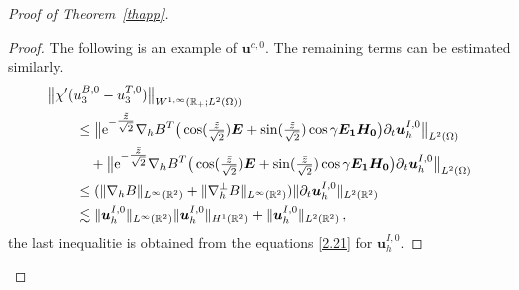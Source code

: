 \documentclass[pdflatex,sn-mathphys-num]{sn-jnl}%
\theoremstyle{thmstyleone}%
\theoremstyle{thmstyletwo}%
\theoremstyle{thmstylethree}%
\theoremstyle{thmstyletwo}
\begin{document}
\begin{proof}[Proof of Theorem~{\upshape\ref{thapp}}]
\begin{proof}
	The following is an example of $\boldsymbol{u}^{c,0}$. The remaining terms can be estimated similarly.
	\begin{align*}
		&\big\lVert\chi'({u}_3^{B,0}-{u}_3^{T,0})\big\rVert_{W^{1,\infty}(\mathbb{R}_+;L^2(\Omega))}\\
		&\qquad\leq\big\lVert
		\mathrm{e}^{-\tfrac{\tilde z}{\sqrt 2}}
		\nabla_hB^T\big(
		\cos(\tfrac{\tilde z}{\sqrt 2})\boldsymbol{E}+\sin(\tfrac{\tilde z}{\sqrt 2})\cos\gamma\boldsymbol{E_1}\boldsymbol{H_0}
		\big)\partial_t{\boldsymbol{u}}^{I,0}_h
		\big\rVert_{L^2(\Omega)}\notag\\
		&\qquad\quad+\big\lVert
		\mathrm{e}^{-\tfrac{\bar z}{\sqrt 2}}
		\nabla_hB^T\big(
		\cos(\tfrac{\bar z}{\sqrt 2})\boldsymbol{E}+\sin(\tfrac{\bar z}{\sqrt 2})\cos\gamma\boldsymbol{E_1}\boldsymbol{H_0}
		\big)\partial_t{\boldsymbol{u}}_h^{I,0}
		\big\rVert_{L^2(\Omega)}\notag\\
		&\qquad\leq
		(\lVert\nabla_{ h}B\rVert_{{L}^{\infty}(\mathbb{R}^2)}
		+\lVert\nabla^\bot_{ h}B\rVert_{{L}^{\infty}(\mathbb{R}^2)})
		\lVert
		\partial_t{\boldsymbol{u}}^{I,0}_h
		\rVert_{{L}^{2}(\mathbb{R}^2)}\notag\\
		&\qquad\lesssim
		\lVert
		\boldsymbol{u}^{I,0}_h
		\rVert_{{L}^{\infty}(\mathbb{R}^2)}
		\lVert
		\boldsymbol{u}^{I,0}_h
		\rVert_{{H}^{1}(\mathbb{R}^2)}+ 
		\lVert
		\boldsymbol{u}^{I,0}_h
		\rVert_{{L}^{2}(\mathbb{R}^2)}
		\,,\notag
	\end{align*}
	the last inequalitie is obtained from the equations \eqref{2.21} for $\boldsymbol{u}^{I,0}_h$.
\end{proof}	




\end{proof}
\end{document}
